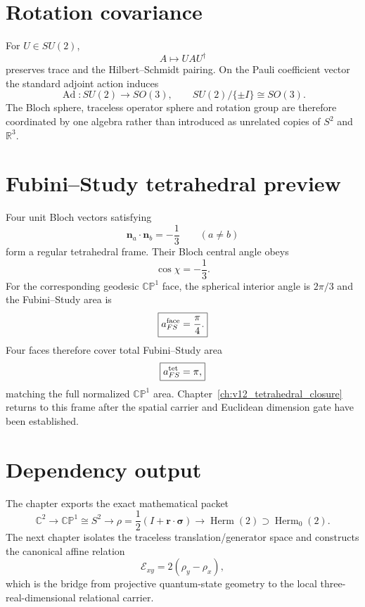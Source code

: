 \section{Rotation covariance}

For $U\in SU(2)$,
\begin{equation}
A\mapsto UAU^\dagger
\end{equation}
preserves trace and the Hilbert--Schmidt pairing. On the Pauli coefficient vector the standard adjoint action induces
\begin{equation}
\boxed{
\operatorname{Ad}:SU(2)\to SO(3),
\qquad
SU(2)/\{\pm I\}\cong SO(3).
}
\label{eq:v12_su2_so3}
\end{equation}
The Bloch sphere, traceless operator sphere and rotation group are therefore coordinated by one algebra rather than introduced as unrelated copies of $S^2$ and $\mathbb R^3$.

\section{Fubini--Study tetrahedral preview}

Four unit Bloch vectors satisfying
\begin{equation}
\mathbf n_a\cdot\mathbf n_b=-\frac13
\qquad(a\neq b)
\end{equation}
form a regular tetrahedral frame. Their Bloch central angle obeys
\begin{equation}
\cos\chi=-\frac13.
\end{equation}
For the corresponding geodesic $\mathbb{CP}^1$ face, the spherical interior angle is $2\pi/3$ and the Fubini--Study area is
\begin{equation}
\boxed{a_{FS}^{\rm face}=\frac\pi4.}
\end{equation}
Four faces therefore cover total Fubini--Study area
\begin{equation}
\boxed{a_{FS}^{\rm tet}=\pi,}
\end{equation}
matching the full normalized $\mathbb{CP}^1$ area. Chapter~\ref{ch:v12_tetrahedral_closure} returns to this frame after the spatial carrier and Euclidean dimension gate have been established.

\section{Dependency output}

The chapter exports the exact mathematical packet
\begin{equation}
\boxed{
\mathbb C^2
\to
\mathbb{CP}^1\cong S^2
\to
\rho=\frac12(I+\mathbf r\cdot\boldsymbol\sigma)
\to
\operatorname{Herm}(2)
\supset
\operatorname{Herm}_0(2).
}
\end{equation}
The next chapter isolates the traceless translation/generator space and constructs the canonical affine relation
\[
\mathcal E_{xy}=2(\rho_y-\rho_x),
\]
which is the bridge from projective quantum-state geometry to the local three-real-dimensional relational carrier.

\clearpage
